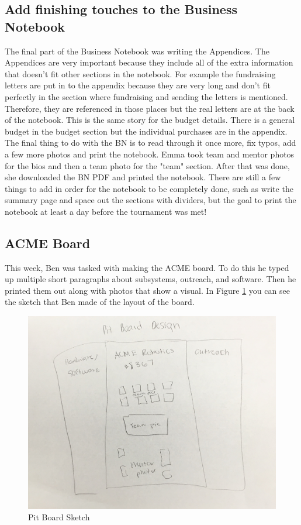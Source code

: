 \documentclass{article}
\newif\ifcontents
\begin{document}
\contentsfalse
\subsection{Add finishing touches to the Business Notebook}
The final part of the Business Notebook was writing the Appendices. The Appendices are very important because they include all of the extra information that doesn't fit other sections in the notebook. For example the fundraising letters are put in to the appendix because they are very long and don't fit perfectly in the section where fundraising and sending the letters is mentioned. Therefore, they are referenced in those places but the real letters are at the back of the notebook. This is the same story for the budget details. There is a general budget in the budget section but the individual purchases are in the appendix. \\
The final thing to do with the BN is to read through it once more, fix typos, add a few more photos and print the notebook. Emma took team and mentor photos for the bios and then a team photo for the "team" section. After that was done, she downloaded the BN PDF and printed the notebook. There are still a few things to add in order for the notebook to be completely done, such as write the summary page and space out the sections with dividers, but the goal to print the notebook at least a day before the tournament was met!

\subsection{ACME Board}
This week, Ben was tasked with making the ACME board. To do this he typed up multiple short paragraphs about subsystems, outreach, and software. Then he printed them out along with photos that show a visual. In Figure \ref{fig:pitboard} you can see the sketch that Ben made of the layout of the board. 

\begin{figure}
    \centering
    \includegraphics[width=.6 \textwidth]{10_11-05/images/pit_board.jpg}
    \caption{Pit Board Sketch}
    \label{fig:pitboard}
\end{figure}
\end{document}
